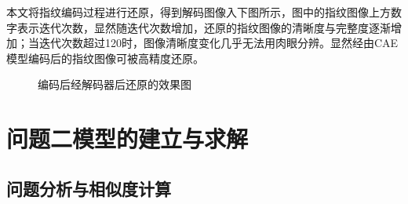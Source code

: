 \documentclass{whutmod}
\begin{document}
    本文将指纹编码过程进行还原，得到解码图像入下图所示，图中的指纹图像上方数字表示迭代次数，显然随迭代次数增加，还原的指纹图像的清晰度与完整度逐渐增加；当迭代次数超过120时，图像清晰度变化几乎无法用肉眼分辨。显然经由CAE模型编码后的指纹图像可被高精度还原。
       	\begin{figure}[H]	
        	\centering
        	\caption{编码后经解码器后还原的效果图}
        	\label{zhiwen}
        \end{figure}
    
    

	\section{问题二模型的建立与求解}
		\subsection{问题分析与相似度计算}
\end{document}
